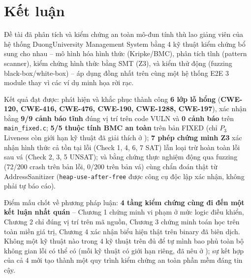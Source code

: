 \section{Kết luận}
\label{sec:ketluan}

Đề tài đã phân tích và kiểm chứng an toàn mô-đun tính thù lao giảng viên của hệ thống DuongUniversity Management System bằng 4 kỹ thuật kiểm chứng bổ sung cho nhau -- mô hình hóa hình thức (Kripke/BMC), phân tích tĩnh (pattern scanner), kiểm chứng hình thức bằng SMT (Z3), và kiểm thử động (fuzzing black-box/white-box) -- áp dụng đồng nhất trên cùng một hệ thống E2E 3 module thay vì các ví dụ minh họa rời rạc.

Kết quả đạt được: phát hiện và khắc phục thành công \textbf{6 lớp lỗ hổng} (\textbf{CWE-120, CWE-416, CWE-476, CWE-190, CWE-1288, CWE-197}), xác nhận bằng \textbf{9/9 cảnh báo tĩnh} đúng vị trí trên code VULN và \textbf{0 cảnh báo} trên \texttt{main\_fixed.c}; \textbf{5/5 thuộc tính BMC an toàn} trên bản FIXED (chỉ $P_3$ Liveness còn giới hạn kỹ thuật đã giải thích ở ); \textbf{7 phép chứng minh Z3} xác nhận hình thức cả tồn tại lỗi (Check 1, 4, 6, 7 SAT) lẫn loại trừ hoàn toàn lỗi sau vá (Check 2, 3, 5 UNSAT); và bằng chứng thực nghiệm động qua fuzzing (72/200 crash trên bản lỗi, 0/200 trên bản vá) cùng chẩn đoán thật từ AddressSanitizer (\texttt{heap-use-after-free} được công cụ độc lập xác nhận, không phải tự báo cáo).

Điểm mấu chốt về phương pháp luận: \textbf{4 tầng kiểm chứng cùng đi đến một kết luận nhất quán} -- Chương 1 chứng minh vi phạm ở mức logic điều khiển, Chương 2 chỉ đúng vị trí trên mã nguồn, Chương 3 chứng minh toán học trên toàn miền giá trị, Chương 4 xác nhận biểu hiện thật trên binary đã biên dịch. Không một kỹ thuật nào trong 4 kỹ thuật trên đủ để tự mình bao phủ toàn bộ không gian lỗi có thể có (mỗi kỹ thuật có giới hạn riêng, đã nêu ở ); sự kết hợp của cả 4 mới tạo thành một quy trình kiểm chứng an toàn phần mềm đáng tin cậy.
